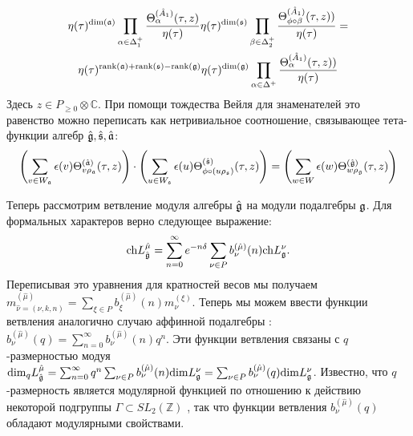 \begin{multline}
  \label{eq:135}
  \eta(\tau)^{\mathrm{dim}(\mathfrak{a})}\prod_{\alpha\in\Delta_{1}^{+}}\frac{\Theta^{(\hat A_{1})}_{\alpha}(\tau,z)}{\eta(\tau)} \eta(\tau)^{\mathrm{dim}(\mathfrak{s})}\prod_{\beta\in\Delta_{2}^{+}}\frac{\Theta^{(\hat A_{1})}_{\phi\circ \beta}(\tau,z))}{\eta(\tau)}=\\
\eta(\tau)^{\mathrm{rank}(\mathfrak{a})+\mathrm{rank}(\mathfrak{s})-\mathrm{rank}(\mathfrak{g})}
\eta(\tau)^{\mathrm{dim}(\mathfrak{g})}\prod_{\alpha\in\Delta^{+}}\frac{\Theta^{(\hat A_{1})}_{\alpha}(\tau,z))}{\eta(\tau)}
\end{multline}
Здесь $z\in P_{\geq 0}\otimes \mathbb{C}$. При помощи тождества Вейля для знаменателей это равенство можно переписать как нетривиальное соотношение, связывающее тета-функции алгебр $\hat{\mathfrak{g}},\hat{\mathfrak{s}},\hat{\mathfrak{a}}$:
\begin{equation}
  \label{eq:143}
  \left(\sum_{v\in W_{\mathfrak{a}}}\epsilon(v) \Theta^{(\hat{\mathfrak{a}})}_{v\rho_{\mathfrak{a}}}(\tau,z)\right)
  \cdot \left(\sum_{u\in W_{\mathfrak{s}}}\epsilon(u) \Theta^{(\hat{\mathfrak{s}})}_{\phi\circ(u\rho_{\mathfrak{s}})}(\tau,z)\right)= 
  \left(\sum_{w\in W}\epsilon(w) \Theta^{(\hat{\mathfrak{g}})}_{w\rho_{\mathfrak{g}}}(\tau,z)\right)
\end{equation}

Теперь рассмотрим ветвление модуля алгебры $\hat{\mathfrak{g}}$ на модули подалгебры $\mathfrak{g}$. Для формальных характеров верно следующее выражение:
\begin{equation}
  \label{eq:149}
\mathrm{ch}L^{\hat{\mu}}_{\hat{\mathfrak{g}}}=\sum_{n=0}^{\infty}e^{-n\delta} \sum_{\nu\in P} b^{(\hat{\mu})}_{\nu}(n) \mathrm{ch} L^{\nu}_{\mathfrak{g}}.
\end{equation}
Переписывая это уравнения для кратностей весов мы получаем
$m^{(\hat{\mu})}_{\hat{\nu}=(\nu,k,n)}=\sum_{\xi\in P}
b^{(\hat{\mu})}_{\xi}(n) m^{(\xi)}_{\nu}$. Теперь мы можем ввести функции ветвления аналогично случаю аффинной подалгебры \cite{kac1988modular,kac1990idl}:
$b^{(\hat{\mu})}_{\nu}(q)=\sum_{n=0}^{\infty}
b^{(\hat{\mu})}_{\nu}(n) q^{n}$.  Эти функции ветвления связаны с  $q$-размерностью модуя $\mathrm{dim}_{q}L^{\hat \mu}_{\hat{\mathfrak{g}}}=\sum_{n=0}^{\infty}q^{n}\sum_{\nu\in P} b^{(\hat \mu)}_{\nu}(n) \mathrm{dim }L^{\nu}_{\mathfrak{g}}=\sum_{\nu\in P}b^{(\hat\mu)}_{\nu}(q) \mathrm{dim} L^{\nu}_{\mathfrak{g}}$. Известно, что  $q$-размерность является модулярной функцией по отношению к действию некоторой подгруппы $\Gamma\subset SL_{2}(\mathbb{Z})$  \cite{gannon2006moonshine}, так что функции ветвления  $b^{(\hat \mu)}_{\nu}(q)$ обладают модулярными свойствами.

